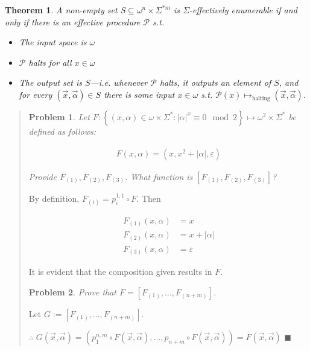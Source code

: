 \documentclass[a4paper, 12pt]{article}
\newtheorem{problem}{Problem}
\newtheorem{theorem}{Theorem}
\newtheorem{problem}{Problem}
\newtheorem{theorem}{Theorem}
\begin{document}
\begin{theorem}
    A non-empty set $S \subseteq \omega^n \times \Sigma^{*m}$ is
    $\Sigma$-effectively enumerable if and only if there is an effective
    procedure $\mathcal{P}$ s.t. 

    \begin{itemize}
        \item The input space is $\omega$
        \item $\mathcal{P}$ halts for all $x \in \omega$ 
        \item The output set is $S$---i.e. whenever $\mathcal{P}$ halts, it
            outputs an element of $S$, and for every $(\overrightarrow{x},
            \overrightarrow{\alpha}) \in S$ there is some input $x \in \omega$
        s.t. $\mathcal{P}(x) \mapsto_{\text{halting}} (\overrightarrow{x},
        \overrightarrow{\alpha})$.
    \end{itemize}
\end{theorem}

\small
\begin{quote}

\begin{problem}
    Let $F : \left\{ (x, \alpha) \in  \omega \times \Sigma^{*} : |\alpha|^x
        \equiv 0 \mod 2
    \right\} \mapsto \omega^2 \times \Sigma^{*}$ be defined as follows: 

    \begin{align*}
        F(x, \alpha) = (x, x^2 + |\alpha|, \varepsilon)
    \end{align*}

    Provide $F_{(1)}, F_{(2)}, F_{(3)}$. What function is $[F_{(1)}, F_{(2)},
    F_{(3)}]$?
\end{problem}

By definition, $F_{(i)} = p_i^{1, 1} \circ F$. Then 

\begin{align*}
    F_{(1)}(x, \alpha) &= x \\
    F_{(2)}(x, \alpha) &= x + |\alpha| \\
    F_{(3)}(x, \alpha) &= \varepsilon
\end{align*}

It is evident that the composition given results in $F$.

\begin{problem}
    Prove that $F = \left[ F_{(1)}, \ldots, F_{(n + m)} \right] $.
\end{problem}

Let $G := \left[ F_{(1)}, \ldots, F_{(n+m)} \right] $. 

$\therefore $  $G(\vec{x}, \vec{\alpha}) = \left( p_1^{n, m} \circ F(\vec{x},
\vec{\alpha}), \ldots, p_{n+m} \circ F(\vec{x}, \vec{\alpha})   \right)  =
F(\vec{x}, \vec{\alpha}) $ $\blacksquare$



\end{quote}
\normalsize
\end{document}
